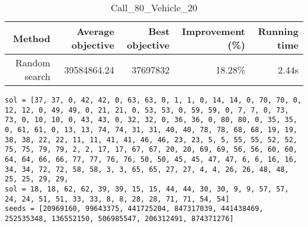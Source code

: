 \begin{table}[ht]
\centering
\caption{Call\_80\_Vehicle\_20}
\label{tab:call80vehicle20}
\begin{tabular}{|r|r|r|r|r|}
Method & Average objective & Best objective & Improvement (\%) & Running time \\
\hline
Random search & 39584864.24 & 37697832 & 18.28\% & 2.44s\\
\end{tabular}%
\end{table}
\begin{lstlisting}[label={lst:call80vehicle20},caption=Optimal solution call\_80\_vehicle\_20]
sol = [37, 37, 0, 42, 42, 0, 63, 63, 0, 1, 1, 0, 14, 14, 0, 70, 70, 0, 12, 12, 0, 49, 49, 0, 21, 21, 0, 53, 53, 0, 59, 59, 0, 7, 7, 0, 73, 73, 0, 10, 10, 0, 43, 43, 0, 32, 32, 0, 36, 36, 0, 80, 80, 0, 35, 35, 0, 61, 61, 0, 13, 13, 74, 74, 31, 31, 40, 40, 78, 78, 68, 68, 19, 19, 38, 38, 22, 22, 11, 11, 41, 41, 46, 46, 23, 23, 5, 5, 55, 55, 52, 52, 75, 75, 79, 79, 2, 2, 17, 17, 67, 67, 20, 20, 69, 69, 56, 56, 60, 60, 64, 64, 66, 66, 77, 77, 76, 76, 50, 50, 45, 45, 47, 47, 6, 6, 16, 16, 34, 34, 72, 72, 58, 58, 3, 3, 65, 65, 27, 27, 4, 4, 26, 26, 48, 48, 25, 25, 29, 29,
sol = 18, 18, 62, 62, 39, 39, 15, 15, 44, 44, 30, 30, 9, 9, 57, 57, 24, 24, 51, 51, 33, 33, 8, 8, 28, 28, 71, 71, 54, 54]
seeds = [20969160, 99643375, 441725204, 847317039, 441438469, 252535348, 136552150, 506985547, 206312491, 874371276]
\end{lstlisting}
\clearpage


